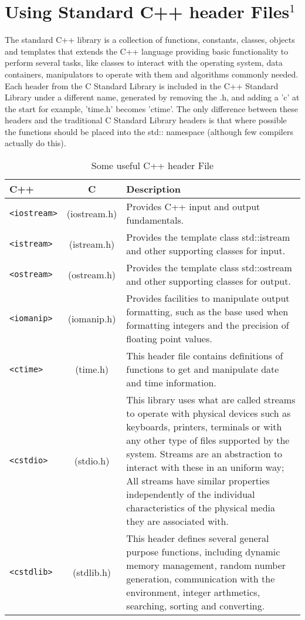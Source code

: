 \documentclass[12pt,a4paper]{article}
\begin{document}
\section{Using Standard C++ header Files$^1$}
The standard C++ library is a collection of functions, constants, classes, objects and templates that extends the C++ language providing basic functionality to perform several tasks, like classes to interact with the operating system, data containers, manipulators to operate with them and algorithms commonly needed.\\
Each header from the C Standard Library is included in the C++ Standard Library under a different name, generated by removing the .h, and adding a 'c' at the start for example, 'time.h' becomes 'ctime'. The only difference between these headers and the traditional C Standard Library headers is that where possible the functions should be placed into the std:: namespace (although few compilers actually do this).\\
\begin{table}[H]
\begin{center}
\vspace{0.3cm}
	\begin{tabular}{lcp{10cm}}
	\hline \hline
		\textbf{C++} \rule{0pt}{2.6ex} & \textbf{C} & \textbf{Description}\\
		\hline
		\verb|<iostream>| \rule{0pt}{2.6ex} & (iostream.h) & Provides C++ input and output fundamentals.\\
		\verb|<istream>| & (istream.h) & Provides the template class std::istream and other supporting classes for input.\\
		\verb|<ostream>| & (ostream.h) & Provides the template class std::ostream and other supporting classes for output.\\
		\verb|<iomanip>| & (iomanip.h) & Provides facilities to manipulate output formatting, such as the base used when formatting integers and the precision of floating point values.\\
		\verb|<ctime>|   & (time.h) & This header file contains definitions of functions to get and manipulate date and time information.\\
		\verb|<cstdio>| & (stdio.h) &  This library uses what are called streams to operate with physical devices such as keyboards, printers, terminals or with any other type of files supported by the system. Streams are an abstraction to interact with these in an uniform way; All streams have similar properties independently of the individual characteristics of the physical media they are associated with.\\
		\verb|<cstdlib>| &(stdlib.h)& This header defines several general purpose functions, including dynamic memory management, random number generation, communication with the environment, integer arthmetics, searching, sorting and converting.\\
		
	\hline \hline
	\end{tabular}
\end{center}
\label{Some useful C++ header File}
\caption{Some useful C++ header File}
\end{table}
\end{document}
